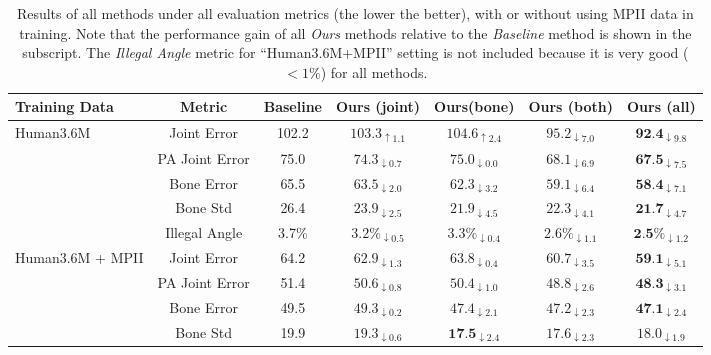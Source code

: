 \documentclass[10pt,twocolumn,letterpaper]{article}
\begin{document}
\begin{table*}
\centering
\small
\begin{tabular}{l|c|c|c|c|c|c}
\hline
Training Data & Metric & Baseline & Ours (joint) & Ours(bone) & Ours (both) & Ours (all)\\
\hline \hline
\multirow{4}{*}{Human3.6M}
& Joint Error    & 102.2 & $103.3_{\uparrow1.1}  $ & $104.6_{\uparrow2.4}  $ 		   & $95.2_{\downarrow7.0}$  & $\textbf{92.4}_{\downarrow9.8}$  \\
& PA Joint Error & 75.0  & $74.3_{\downarrow0.7}$  & $75.0_{\downarrow0.0}$  		   & $68.1_{\downarrow6.9}$  & $\textbf{67.5}_{\downarrow7.5}$  \\
& Bone Error     & 65.5  & $63.5_{\downarrow2.0}$  & $62.3_{\downarrow3.2}$  		   & $59.1_{\downarrow6.4}$  & $\textbf{58.4}_{\downarrow7.1}$  \\
& Bone Std       & 26.4  & $23.9_{\downarrow2.5}$  & $21.9_{\downarrow4.5}$  		   & $22.3_{\downarrow4.1}$  & $\textbf{21.7}_{\downarrow4.7}$  \\
& Illegal Angle  & 3.7\% & $3.2\%_{\downarrow0.5}$ & $3.3\%_{\downarrow0.4}$  	   & $2.6\%_{\downarrow1.1}$ & $\textbf{2.5\%}_{\downarrow1.2}$ \\
\hline
\multirow{4}{*}{Human3.6M + MPII}
& Joint Error    & 64.2  & $62.9_{\downarrow1.3}$  & $63.8_{\downarrow0.4}$  		   & $60.7_{\downarrow3.5}$  & $\textbf{59.1}_{\downarrow5.1}$  \\
& PA Joint Error & 51.4  & $50.6_{\downarrow0.8}$  & $50.4_{\downarrow1.0}$  		   & $48.8_{\downarrow2.6}$  & $\textbf{48.3}_{\downarrow3.1}$  \\
&Bone Error  	 & 49.5  & $49.3_{\downarrow0.2}$  & $47.4_{\downarrow2.1}$		   & $47.2_{\downarrow2.3}$  & $\textbf{47.1}_{\downarrow2.4}$  \\
& Bone Std       & 19.9  & $19.3_{\downarrow0.6}$  & $\textbf{17.5}_{\downarrow2.4}$ & $17.6_{\downarrow2.3}$  & $18.0_{\downarrow1.9}$ 		  \\
\end{tabular}
\caption{Results of all methods under all evaluation metrics (the lower the better), with or without using MPII data in training. Note that the performance gain of all \emph{Ours} methods relative to the \emph{Baseline} method is shown in the subscript. The \emph{Illegal Angle} metric for ``Human3.6M+MPII'' setting is not included because it is very good ($<1\%$) for all methods.}
\label{table:hm36ablation}
\end{table*}
\end{document}
